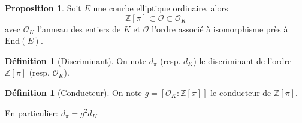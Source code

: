 \documentclass[10pt,a4paper]{beamer}
\theoremstyle{plain}
\theoremstyle{definition}
\theoremstyle{definition}
\theoremstyle{definition}
\newtheorem{prop}[thm]{Proposition}
\theoremstyle{definition}
\newtheorem{defi}[thm]{Définition}
\theoremstyle{remark}
\theoremstyle{remark}
\begin{document}
\begin{frame}

\end{frame}

%
%
%

\begin{frame}

\begin{prop}
Soit $E$ une courbe elliptique ordinaire, alors 
\[
\mathbb{Z} \left[ \pi \right] \subset \mathcal{O} \subset \mathcal{O}_K
\] 
avec $\mathcal{O}_K$ l'anneau des entiers de $K$ et $\mathcal{O}$ l'ordre 
associé à isomorphisme près à $\mathrm{End}(E)$. %
\end{prop}

\begin{defi}[Discriminant]
On note $d_{\pi}$ (resp. $d_K$) le discriminant de l'ordre $\mathbb{Z}\left[ \pi \right]$ (resp. $\mathcal{O}_K$).
\end{defi}

\begin{defi}[Conducteur]
On note $g=[\mathcal{O}_K:\mathbb{Z}[\pi]]$ le conducteur de $\mathbb{Z}[\pi]$. %
\end{defi}

En particulier: $d_{\pi}=g^2d_K$

\end{frame}
\end{document}
